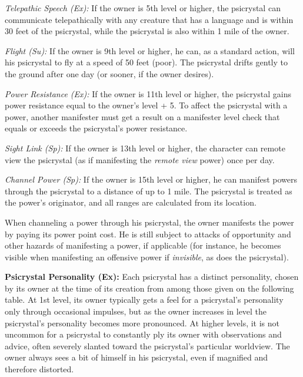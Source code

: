 \documentclass{article}
\begin{document}
\textit{Telepathic Speech (Ex): }If the owner is 5th level or higher, the psicrystal 
can communicate telepathically with any creature that has a language and is within 
30 feet of the psicrystal, while the psicrystal is also within 1 mile of the owner.

\textit{Flight (Su): }If the owner is 9th level or higher, he can, as a standard 
action, will his psicrystal to fly at a speed of 50 feet (poor). The psicrystal 
drifts gently to the ground after one day (or sooner, if the owner desires).

\textit{Power Resistance (Ex): }If the owner is 11th level or higher, the psicrystal 
gains power resistance equal to the owner's level + 5. To affect the psicrystal 
with a power, another manifester must get a result on a manifester level check 
that equals or exceeds the psicrystal's power resistance.

\textit{Sight Link (Sp): }If the owner is 13th level or higher, the character can 
remote view the psicrystal (as if manifesting the \textit{remote view }power) once 
per day. 

\textit{Channel Power (Sp): }If the owner is 15th level or higher, he can manifest 
powers through the psicrystal to a distance of up to 1 mile. The psicrystal is 
treated as the power's originator, and all ranges are calculated from its location.

When channeling a power through his psicrystal, the owner manifests the power by 
paying its power point cost. He is still subject to attacks of opportunity and 
other hazards of manifesting a power, if applicable (for instance, he becomes visible 
when manifesting an offensive power if \textit{invisible}, as does the psicrystal).

\vspace{12pt}
\textbf{Psicrystal Personality (Ex):} Each psicrystal has a distinct personality, 
chosen by its owner at the time of its creation from among those given on the following 
table. At 1st level, its owner typically gets a feel for a psicrystal's personality 
only through occasional impulses, but as the owner increases in level the psicrystal's 
personality becomes more pronounced. At higher levels, it is not uncommon for a 
psicrystal to constantly ply its owner with observations and advice, often severely 
slanted toward the psicrystal's particular worldview. The owner always sees a bit 
of himself in his psicrystal, even if magnified and therefore distorted.
\end{document}

